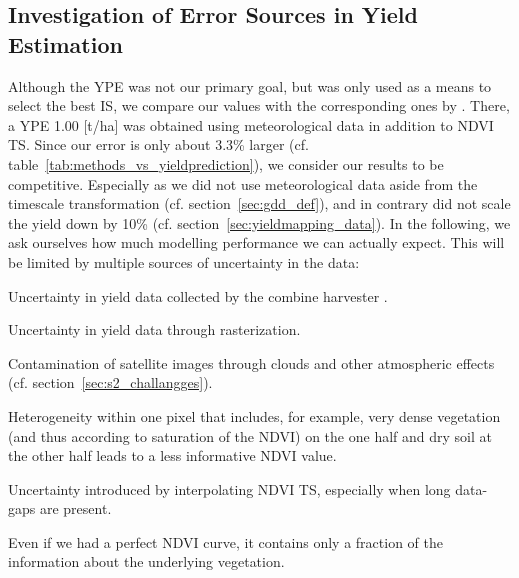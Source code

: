 {    \subsection{Investigation of Error Sources in Yield Estimation}{\label{sec:discuss_high-rmse-in-yield-prdiction}
        Although the YPE was not our primary goal, but was only used as a means to select the best IS, we compare our values with the corresponding ones by \cite{perichPixelbasedCropYield2022}. There, a YPE 1.00 [t/ha] was obtained using meteorological data in addition to NDVI TS. Since our error is only about 3.3\% larger (cf. table~\ref{tab:methods_vs_yieldprediction}), we consider our results to be competitive. Especially as we did not use meteorological data aside from the timescale transformation (cf. section~\ref{sec:gdd_def}), and in contrary did not scale the yield down by 10\% (cf. section~\ref{sec:yieldmapping_data}). In the following, we ask ourselves how much modelling performance we can actually expect. This will be limited by multiple sources of uncertainty in the data:
        \begin{Nenumerate}
            \item Uncertainty in yield data collected by the combine harvester \citep{robinsonComparingPerformanceTechniques2005}.
            \item Uncertainty in yield data through rasterization.
            \item Contamination of satellite images through clouds and other atmospheric effects (cf. section~\ref{sec:s2_challangges}).
            \item Heterogeneity within one pixel that includes, for example, very dense vegetation (and thus according to \citeauthor{guNDVISaturationAdjustment2013} saturation of the NDVI) on the one half and dry soil at the other half leads to a less informative NDVI value.
            \item Uncertainty introduced by interpolating NDVI TS, especially when long data-gaps are present.
        \end{Nenumerate}
        Even if we had a perfect NDVI curve, it contains only a fraction of the information about the underlying vegetation. 
}}
